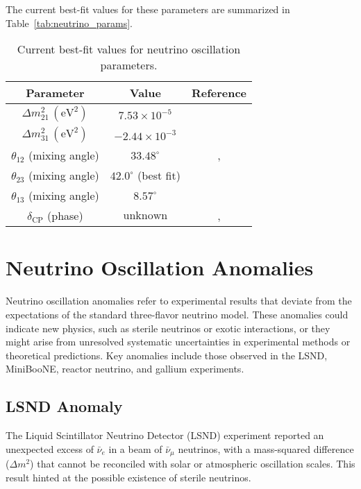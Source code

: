 \documentclass[a4paper,12pt,numbered]{article}
\begin{document}
The current best-fit values for these parameters are summarized in Table~\ref{tab:neutrino_params}.

\begin{table}[h!]
\centering
\begin{tabular}{|c|c|c|}
\hline
\textbf{Parameter} & \textbf{Value} & \textbf{Reference} \\
\hline
\(\Delta m^2_{21} \, (\text{eV}^2)\) & \(7.53 \times 10^{-5}\) & \cite{Fogli_2012} \\
\(\Delta m^2_{31} \, (\text{eV}^2)\) & \(-2.44 \times 10^{-3}\) & \cite{Fogli_2012} \\
\(\theta_{12}\) (mixing angle) & \(33.48^\circ\) & \cite{Fogli_2012}, \cite{Fukuda_2002} \\
\(\theta_{23}\) (mixing angle) & \(42.0^\circ\) (best fit) & \cite{T2K_2023} \\
\(\theta_{13}\) (mixing angle) & \(8.57^\circ\) & \cite{T2K_2023} \\
\(\delta_{\text{CP}}\) (phase) & \( \text{unknown} \) & \cite{Fogli_2012}, \cite{T2K_2023} \\
\hline
\end{tabular}
\caption{Current best-fit values for neutrino oscillation parameters.}
\end{table}

\section{Neutrino Oscillation Anomalies}

Neutrino oscillation anomalies refer to experimental results that deviate from the expectations of the standard three-flavor neutrino model. These anomalies could indicate new physics, such as sterile neutrinos or exotic interactions, or they might arise from unresolved systematic uncertainties in experimental methods or theoretical predictions. Key anomalies include those observed in the LSND, MiniBooNE, reactor neutrino, and gallium experiments.

\subsection{LSND Anomaly}  
The Liquid Scintillator Neutrino Detector (LSND) experiment reported an unexpected excess of $\bar{\nu}_e$ in a beam of $\bar{\nu}_\mu$ neutrinos, with a mass-squared difference ($\Delta m^2$) that cannot be reconciled with solar or atmospheric oscillation scales. This result hinted at the possible existence of sterile neutrinos.
\end{document}
